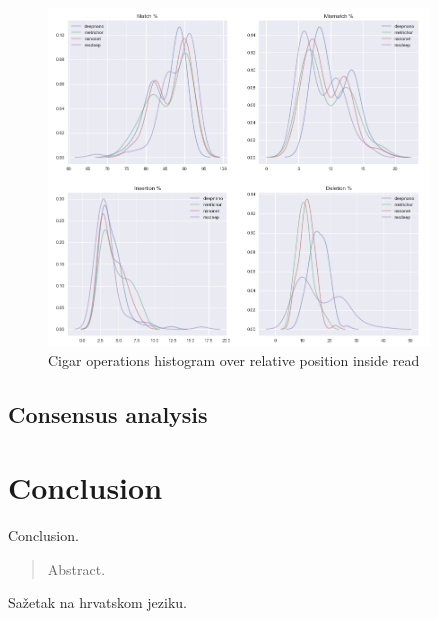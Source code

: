 \documentclass[times, utf8, diplomski, numeric, english]{fer}
\begin{document}
\begin{figure}[!ht]
	\begin{center}
		\includegraphics[width=0.9\textwidth]{./imgs/results/lambda/kde_cigar.png}
		\caption{Cigar operations histogram over relative position inside read}
		\label{fg:lambda_kde}
	\end{center}
\end{figure}
\section{Consensus analysis}

\chapter{Conclusion}
Conclusion.





\begin{abstract}
Abstract.

\end{abstract}

\begin{sazetak}
Sažetak na hrvatskom jeziku.

\end{sazetak}
\end{document}
